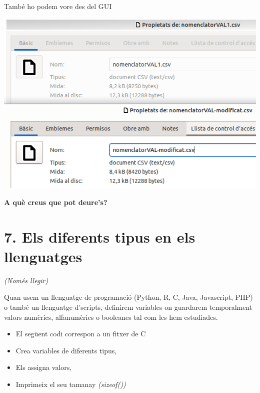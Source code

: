\documentclass[
  12 pt,
  a4paper,
]{article}
\providecommand{\tightlist}{%
  \setlength{\itemsep}{0pt}\setlength{\parskip}{0pt}}
\begin{document}
També ho podem vore des del GUI

\includegraphics{png/ls2.png}

\textbf{A què creus que pot deure's?}

\section{7. Els diferents tipus en els
llenguatges}\label{els-diferents-tipus-en-els-llenguatges}

\emph{(Només llegir)}

Quan usem un llenguatge de programació (Python, R, C, Java, Javascript,
PHP) o també un llenguatge d'scripts, definirem variables on guardarem
temporalment valors numèrics, alfanumèrics o booleanes tal com les hem
estudiades.

\begin{itemize}
\tightlist
\item
  El següent codi correspon a un fitxer de C
\item
  Crea variables de diferents tipus,
\item
  Els assigna valors,
\item
  Imprimeix el seu tamanay \emph{(sizeof())}
\end{itemize}
\end{document}
